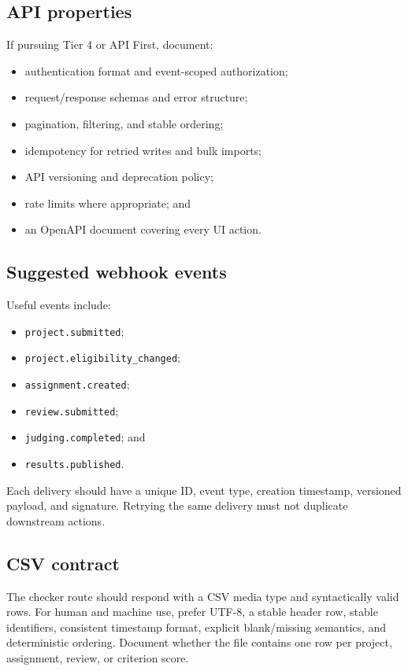 \subsection{API properties}

If pursuing Tier 4 or API First, document:

\begin{itemize}
  \item authentication format and event-scoped authorization;
  \item request/response schemas and error structure;
  \item pagination, filtering, and stable ordering;
  \item idempotency for retried writes and bulk imports;
  \item API versioning and deprecation policy;
  \item rate limits where appropriate; and
  \item an OpenAPI document covering every UI action.
\end{itemize}

\subsection{Suggested webhook events}

Useful events include:

\begin{itemize}
  \item \texttt{project.submitted};
  \item \texttt{project.eligibility\_changed};
  \item \texttt{assignment.created};
  \item \texttt{review.submitted};
  \item \texttt{judging.completed}; and
  \item \texttt{results.published}.
\end{itemize}

Each delivery should have a unique ID, event type, creation timestamp, versioned payload, and signature. Retrying the same delivery must not duplicate downstream actions.

\subsection{CSV contract}

The checker route should respond with a CSV media type and syntactically valid rows. For human and machine use, prefer UTF-8, a stable header row, stable identifiers, consistent timestamp format, explicit blank/missing semantics, and deterministic ordering. Document whether the file contains one row per project, assignment, review, or criterion score.

